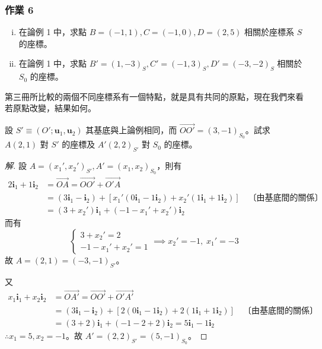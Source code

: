 \subsubsection*{作業 6}
\begin{enumerate}[(i)]
  \item 在論例 1 中，求點 $B = (-1, 1), C = (-1, 0), D = (2, 5)$ 相關於座標系 $S$ 的座標。
  \item 在論例 1 中，求點 $B' = (1, -3)_S, C' = (-1, 3)_S, D' = (-3, -2)_S$ 相關於 $S_0$ 的座標。
\end{enumerate}

第三冊所比較的兩個不同座標系有一個特點，就是具有共同的原點，現在我們來看若原點改變，結果如何。

\begin{example}[例 3]
設 $S' \equiv (O'; \mathbf{u}_1, \mathbf{u}_2)$ 其基底與上論例相同，而 $\vec{OO'} = (3, -1)_{S_0}$。試求 $A(2, 1)$ 對 $S'$ 的座標及 $A'(2, 2)_{S'}$ 對 $S_0$ 的座標。
\end{example}

\begin{proof}[解]
設 $A = (x_1', x_2')_{S'}, A' = (x_1, x_2)_{S_0}$，則有
\begin{align*}
2\mathbf{i}_1 + 1\mathbf{i}_2 &= \vec{OA} = \vec{OO'} + \vec{O'A} \\
&= (3\mathbf{i}_1 - \mathbf{i}_2) + [x_1'(0\mathbf{i}_1 - 1\mathbf{i}_2) + x_2'(1\mathbf{i}_1 + 1\mathbf{i}_2)] \quad \text{〔由基底間的關係〕} \\
&= (3 + x_2')\mathbf{i}_1 + (-1 - x_1' + x_2')\mathbf{i}_2
\end{align*}
而有
\[ \begin{cases} 3 + x_2' = 2 \\ -1 - x_1' + x_2' = 1 \end{cases} \implies x_2' = -1, \; x_1' = -3 \]
故 $A = (2, 1) = (-3, -1)_{S'}$。

又
\begin{align*}
x_1\mathbf{i}_1 + x_2\mathbf{i}_2 &= \vec{OA'} = \vec{OO'} + \vec{O'A'} \\
&= (3\mathbf{i}_1 - \mathbf{i}_2) + [2(0\mathbf{i}_1 - 1\mathbf{i}_2) + 2(1\mathbf{i}_1 + 1\mathbf{i}_2)] \quad \text{〔由基底間的關係〕} \\
&= (3 + 2)\mathbf{i}_1 + (-1 - 2 + 2)\mathbf{i}_2 = 5\mathbf{i}_1 - 1\mathbf{i}_2
\end{align*}
$\therefore x_1 = 5, x_2 = -1$。故 $A' = (2, 2)_{S'} = (5, -1)_{S_0}$。
\end{proof}

